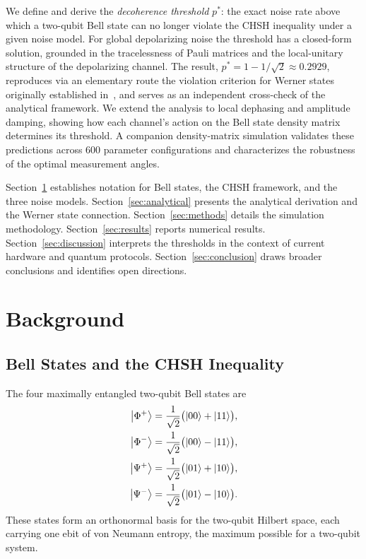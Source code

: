 \documentclass[12pt]{article}
\newcommand{\Phiplus}{\ket{\Phi^+}}
\newcommand{\Phiminus}{\ket{\Phi^-}}
\newcommand{\Psiplus}{\ket{\Psi^+}}
\newcommand{\Psiminus}{\ket{\Psi^-}}
\newcommand{\pstar}{p^*}
\begin{document}
We define and derive the \textit{decoherence threshold} $\pstar$: the exact noise rate above which
a two-qubit Bell state can no longer violate the CHSH inequality under a given noise model.
For global depolarizing noise the threshold has a closed-form solution, grounded in the
tracelessness of Pauli matrices and the local-unitary structure of the depolarizing channel.
The result, $\pstar = 1 - 1/\sqrt{2} \approx 0.2929$, reproduces via an elementary route
the violation criterion for Werner states originally established in~\cite{werner1989, gisin1991},
and serves as an independent cross-check of the analytical framework.
We extend the analysis to local dephasing and amplitude damping, showing how each channel's
action on the Bell state density matrix determines its threshold.
A companion density-matrix simulation validates these predictions across 600 parameter
configurations and characterizes the robustness of the optimal measurement angles.

Section~\ref{sec:background} establishes notation for Bell states, the CHSH framework, and the
three noise models.
Section~\ref{sec:analytical} presents the analytical derivation and the Werner state connection.
Section~\ref{sec:methods} details the simulation methodology.
Section~\ref{sec:results} reports numerical results.
Section~\ref{sec:discussion} interprets the thresholds in the context of current hardware and
quantum protocols.
Section~\ref{sec:conclusion} draws broader conclusions and identifies open directions.

\section{Background}
\label{sec:background}

\subsection{Bell States and the CHSH Inequality}
\label{subsec:bell_chsh}

The four maximally entangled two-qubit Bell states are
\begin{align}
  \Phiplus  &= \frac{1}{\sqrt{2}}\bigl(\ket{00} + \ket{11}\bigr), \label{eq:phiplus}\\
  \Phiminus &= \frac{1}{\sqrt{2}}\bigl(\ket{00} - \ket{11}\bigr), \label{eq:phiminus}\\
  \Psiplus  &= \frac{1}{\sqrt{2}}\bigl(\ket{01} + \ket{10}\bigr), \label{eq:psiplus}\\
  \Psiminus &= \frac{1}{\sqrt{2}}\bigl(\ket{01} - \ket{10}\bigr). \label{eq:psiminus}
\end{align}
These states form an orthonormal basis for the two-qubit Hilbert space, each carrying one ebit of
von Neumann entropy, the maximum possible for a two-qubit system.
\end{document}
